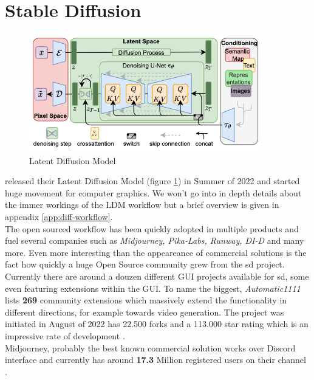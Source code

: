 \documentclass[
  a4paper,  %
  twoside,  %
  bibliography=totoc,
  headsepline,
  cleardoublepage=empty,
  parskip=half,
  draft=false
]{scrbook}
\begin{document}
\section{Stable Diffusion}
\begin{figure}[h]
  \centering
  \includegraphics[width=0.9\textwidth]{./graphics/images/latent-diffusion.png}
  \caption{Latent Diffusion Model \cite{rombachHighResolutionImageSynthesis2022}}
  \label{fig:ldm-arch}
\end{figure}
\citet{rombachHighResolutionImageSynthesis2022} released their Latent Diffusion Model (figure \ref{fig:ldm-arch}) in Summer of 2022 and started huge movement for computer graphics. We won't go into in depth details about the immer workings of the LDM workflow but a brief overview is given in appendix \ref{app:diff-workflow}.\\
The open sourced workflow has been quickly adopted in multiple products and fuel several companies such as \textit{Midjourney, Pika-Labs, Runway, DI-D} and many more. Even more interesting than the appeareance of commercial solutions is the fact how quickly a huge Open Source community grew from the \gls{sd} project. Currently there are around a douzen different GUI projects available for \gls{sd}, some even featuring extensions within the GUI. To name the biggest, \textit{Automatic1111} lists \textbf{269} community extensions which massively extend the functionality in different directions, for example towards video generation. The project was initiated in August of 2022 has 22.500 forks and a 113.000 star rating which is an impressive rate of development \cite{AUTOMATIC1111StablediffusionwebuiStable}. \\
Midjourney, probably the best known commercial solution works over Discord interface and currently has around \textbf{17.3} Million registered users on their channel \cite{midjourneyJoinMidjourneyDiscord}. \\
\end{document}
